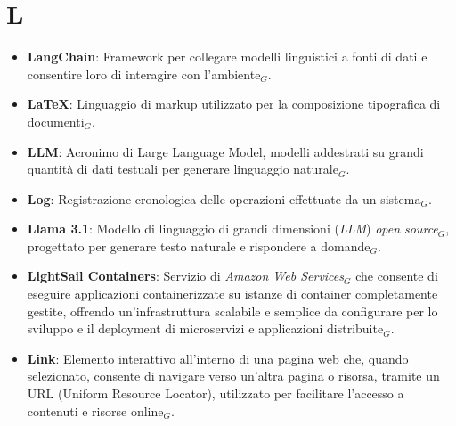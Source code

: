 \section{L}
\begin{itemize}
    \item \textbf{LangChain}: Framework per collegare modelli linguistici a fonti di dati e consentire loro di interagire con l'ambiente$_G$.
    \item \textbf{LaTeX}: Linguaggio di markup utilizzato per la composizione tipografica di documenti$_G$.
    \item \textbf{LLM}: Acronimo di Large Language Model, modelli addestrati su grandi quantità di dati testuali per generare linguaggio naturale$_G$.
    \item \textbf{Log}: Registrazione cronologica delle operazioni effettuate da un sistema$_G$.
    \item \textbf{Llama 3.1}: Modello di linguaggio di grandi dimensioni (\textit{LLM}) \textit{open source}$_G$, progettato per generare testo naturale e rispondere a domande$_G$.
    \item \textbf{LightSail Containers}: Servizio di \textit{Amazon Web Services}$_G$ che consente di eseguire applicazioni containerizzate su istanze di container completamente gestite, offrendo un'infrastruttura scalabile e semplice da configurare per lo sviluppo e il deployment di microservizi e applicazioni distribuite$_G$.
    \item \textbf{Link}: Elemento interattivo all'interno di una pagina web che, quando selezionato, consente di navigare verso un'altra pagina o risorsa, tramite un URL (Uniform Resource Locator), utilizzato per facilitare l'accesso a contenuti e risorse online$_G$.
\end{itemize}
